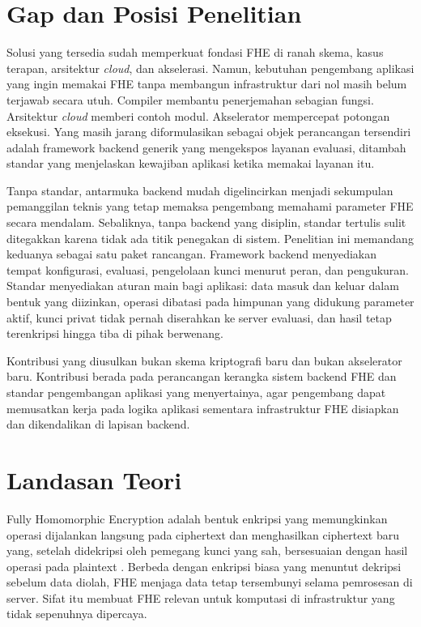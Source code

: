 \documentclass[12pt,a4paper,oneside]{report}
\begin{document}
\section{Gap dan Posisi Penelitian}

Solusi yang tersedia sudah memperkuat fondasi FHE di ranah skema, kasus terapan, arsitektur \emph{cloud}, dan akselerasi. Namun, kebutuhan pengembang aplikasi yang ingin memakai FHE tanpa membangun infrastruktur dari nol masih belum terjawab secara utuh. Compiler membantu penerjemahan sebagian fungsi. Arsitektur \emph{cloud} memberi contoh modul. Akselerator mempercepat potongan eksekusi. Yang masih jarang diformulasikan sebagai objek perancangan tersendiri adalah framework backend generik yang mengekspos layanan evaluasi, ditambah standar yang menjelaskan kewajiban aplikasi ketika memakai layanan itu.

Tanpa standar, antarmuka backend mudah digelincirkan menjadi sekumpulan pemanggilan teknis yang tetap memaksa pengembang memahami parameter FHE secara mendalam. Sebaliknya, tanpa backend yang disiplin, standar tertulis sulit ditegakkan karena tidak ada titik penegakan di sistem. Penelitian ini memandang keduanya sebagai satu paket rancangan. Framework backend menyediakan tempat konfigurasi, evaluasi, pengelolaan kunci menurut peran, dan pengukuran. Standar menyediakan aturan main bagi aplikasi: data masuk dan keluar dalam bentuk yang diizinkan, operasi dibatasi pada himpunan yang didukung parameter aktif, kunci privat tidak pernah diserahkan ke server evaluasi, dan hasil tetap terenkripsi hingga tiba di pihak berwenang.

Kontribusi yang diusulkan bukan skema kriptografi baru dan bukan akselerator baru. Kontribusi berada pada perancangan kerangka sistem backend FHE dan standar pengembangan aplikasi yang menyertainya, agar pengembang dapat memusatkan kerja pada logika aplikasi sementara infrastruktur FHE disiapkan dan dikendalikan di lapisan backend.

\section{Landasan Teori}

Fully Homomorphic Encryption adalah bentuk enkripsi yang memungkinkan operasi dijalankan langsung pada ciphertext dan menghasilkan ciphertext baru yang, setelah didekripsi oleh pemegang kunci yang sah, bersesuaian dengan hasil operasi pada plaintext \cite{devi2025privacyHealthcareFhe,epishkina2025cloudHeArchitecture}. Berbeda dengan enkripsi biasa yang menuntut dekripsi sebelum data diolah, FHE menjaga data tetap tersembunyi selama pemrosesan di server. Sifat itu membuat FHE relevan untuk komputasi di infrastruktur yang tidak sepenuhnya dipercaya.
\end{document}
